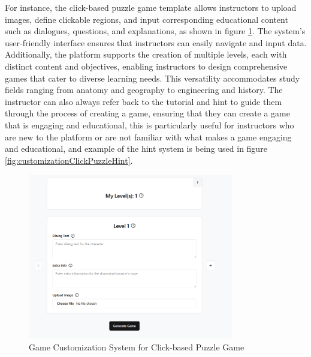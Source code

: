 For instance, the click-based puzzle game template allows instructors to upload images, define clickable regions, and input corresponding educational content such as dialogues, questions, and explanations, as shown in figure \ref{fig:customizationClickPuzzle}. The system’s user-friendly interface ensures that instructors can easily navigate and input data. Additionally, the platform supports the creation of multiple levels, each with distinct content and objectives, enabling instructors to design comprehensive games that cater to diverse learning needs. This versatility accommodates study fields ranging from anatomy and geography to engineering and history. The instructor can also always refer back to the tutorial and hint to guide them through the process of creating a game, ensuring that they can create a game that is engaging and educational, this is particularly useful for instructors who are new to the platform or are not familiar with what makes a game engaging and educational, and example of the hint system is being used in figure \ref{fig:customizationClickPuzzleHint}.

\begin{figure}
	\centering
	\includegraphics[width=0.8\textwidth]{figures/Diagnose_Game/Instructor_Portal_Diagnose_Game.png}
	\caption{Game Customization System for Click-based Puzzle Game}
	\label{fig:customizationClickPuzzle}
\end{figure}

